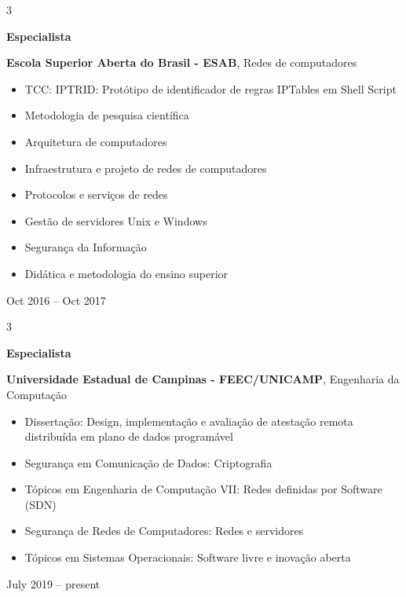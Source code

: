\documentclass[10pt, letterpaper]{article}
\newenvironment{highlights}{
    \begin{itemize}[
        topsep=0.10 cm,
        parsep=0.10 cm,
        partopsep=0pt,
        itemsep=0pt,
        leftmargin=0.4 cm + 10pt
    ]
}{
    \end{itemize}
} %
\newenvironment{threecolentry}[3][]{
    \onecolentry
    \def\thirdColumn{#3}
    \setcolumnwidth{1 cm, \fill, 4.5 cm}
    \begin{paracol}{3}
    {\raggedright #2} \switchcolumn
}{
    \switchcolumn \raggedleft \thirdColumn
    \end{paracol}
    \endonecolentry
} %
\begin{document}
        \vspace{0.2 cm}

        \begin{threecolentry}{\textbf{Especialista}}{
            Oct 2016 – Oct 2017
        }
            \textbf{Escola Superior Aberta do Brasil - ESAB}, Redes de computadores
            \begin{highlights}
                \item TCC: IPTRID: Protótipo de identificador de regras IPTables em Shell Script
                \item Metodologia de pesquisa científica
                \item Arquitetura de computadores
                \item Infraestrutura e projeto de redes de computadores
                \item Protocolos e serviços de redes
                \item Gestão de servidores Unix e Windows
                \item Segurança da Informação
                \item Didática e metodologia do ensino superior
            \end{highlights}
        \end{threecolentry}

        \vspace{0.2 cm}

        \begin{threecolentry}{\textbf{Especialista}}{
            July 2019 – present
        }
            \textbf{Universidade Estadual de Campinas - FEEC/UNICAMP}, Engenharia da Computação
            \begin{highlights}
                \item Dissertação: Design, implementação e avaliação de atestação remota distribuída em plano de dados programável
                \item Segurança em Comunicação de Dados: Criptografia
                \item Tópicos em Engenharia de Computação VII: Redes definidas por Software (SDN)
                \item Segurança de Redes de Computadores: Redes e servidores
                \item Tópicos em Sistemas Operacionais: Software livre e inovação aberta
            \end{highlights}
        \end{threecolentry}
\end{document}
